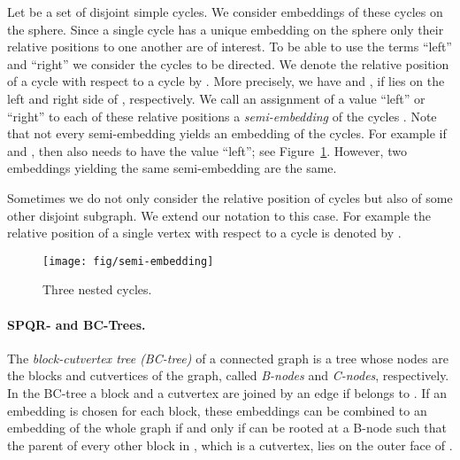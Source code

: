\documentclass{scrartcl}
\newcommand{\1}[1]{{\normalfont \ensuremath{#1^{\tiny\circled{1}}}}} \newcommand{\2}[1]{{\normalfont \ensuremath{#1^{\tiny\circled{2}}}}} \renewcommand{\k}[1]{{\normalfont \ensuremath{#1^{\tiny\circled{k}}}}} \newcommand{\proj}[2]{\ensuremath{\left.#1\right|_{#2}}} \newcommand{\eps}{\varepsilon}
\theoremstyle{plain} \newtheorem{theorem}{Theorem} \newcounter{lemmacounter} \setcounter{lemmacounter}{0} \newtheorem{lemma}[lemmacounter]{Lemma} \newtheorem{fact}{Fact}  \newtheorem{corollary}{Corollary} \theoremstyle{definition} \newtheorem{definition}{Definition}
\begin{document}
Let  be a set of disjoint simple
cycles.  We consider embeddings of these cycles on the sphere.  Since
a single cycle has a unique embedding on the sphere only their
relative positions to one another are of interest.  To be able to use
the terms ``left'' and ``right'' we consider the cycles to be
directed.  We denote the relative position of a cycle  with
respect to a cycle  by .  More precisely, we
have  and , if  lies on the left and right side of ,
respectively.  We call an assignment of a value ``left'' or ``right''
to each of these relative positions a \emph{semi-embedding} of the
cycles .  Note that not every
semi-embedding yields an embedding of the cycles.  For example if
 and
, then  also
needs to have the value ``left''; see Figure~\ref{fig:semi-embedding}.
However, two embeddings yielding the same semi-embedding are the same.

Sometimes we do not only consider the relative position of cycles but
also of some other disjoint subgraph.  We extend our notation to this
case.  For example the relative position of a single vertex  with
respect to a cycle  is denoted by .

\begin{figure}
  \centering
  \texttt{[image: fig/semi-embedding]}
  \caption{Three nested cycles.}
  \label{fig:semi-embedding}
\end{figure}

\paragraph{SPQR- and BC-Trees.}
\label{sec:spqr-trees}

The \emph{block-cutvertex tree (BC-tree)}  of a connected
graph is a tree whose nodes are the blocks and cutvertices of the
graph, called \emph{B-nodes} and \emph{C-nodes}, respectively.  In the
BC-tree a block  and a cutvertex  are joined by an edge if 
belongs to .  If an embedding is chosen for each block, these
embeddings can be combined to an embedding of the whole graph if and
only if  can be rooted at a B-node such that the parent of
every other block  in , which is a cutvertex, lies on
the outer face of .
\end{document}
